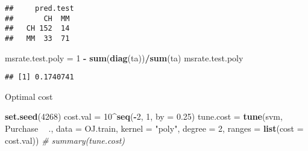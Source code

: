 \documentclass[]{article}
\newenvironment{Shaded}{\begin{snugshade}}{\end{snugshade}}
\newcommand{\CommentTok}[1]{\textcolor[rgb]{0.56,0.35,0.01}{\textit{#1}}}
\newcommand{\DataTypeTok}[1]{\textcolor[rgb]{0.13,0.29,0.53}{#1}}
\newcommand{\DecValTok}[1]{\textcolor[rgb]{0.00,0.00,0.81}{#1}}
\newcommand{\FloatTok}[1]{\textcolor[rgb]{0.00,0.00,0.81}{#1}}
\newcommand{\KeywordTok}[1]{\textcolor[rgb]{0.13,0.29,0.53}{\textbf{#1}}}
\newcommand{\NormalTok}[1]{#1}
\newcommand{\OperatorTok}[1]{\textcolor[rgb]{0.81,0.36,0.00}{\textbf{#1}}}
\newcommand{\StringTok}[1]{\textcolor[rgb]{0.31,0.60,0.02}{#1}}
\begin{document}
\begin{verbatim}
##     pred.test
##       CH  MM
##   CH 152  14
##   MM  33  71
\end{verbatim}

\begin{Shaded}
\begin{Highlighting}[]
\NormalTok{msrate.test.poly =}\StringTok{ }\DecValTok{1} \OperatorTok{-}\StringTok{ }\KeywordTok{sum}\NormalTok{(}\KeywordTok{diag}\NormalTok{(ta))}\OperatorTok{/}\KeywordTok{sum}\NormalTok{(ta)}
\NormalTok{msrate.test.poly}
\end{Highlighting}
\end{Shaded}

\begin{verbatim}
## [1] 0.1740741
\end{verbatim}

Optimal cost

\begin{Shaded}
\begin{Highlighting}[]
\KeywordTok{set.seed}\NormalTok{(}\DecValTok{4268}\NormalTok{)}
\NormalTok{cost.val =}\StringTok{ }\DecValTok{10}\OperatorTok{^}\KeywordTok{seq}\NormalTok{(}\OperatorTok{-}\DecValTok{2}\NormalTok{, }\DecValTok{1}\NormalTok{, }\DataTypeTok{by =} \FloatTok{0.25}\NormalTok{)}
\NormalTok{tune.cost =}\StringTok{ }\KeywordTok{tune}\NormalTok{(svm, Purchase }\OperatorTok{~}\StringTok{ }\NormalTok{., }\DataTypeTok{data =}\NormalTok{ OJ.train, }\DataTypeTok{kernel =} \StringTok{"poly"}\NormalTok{, }\DataTypeTok{degree =} \DecValTok{2}\NormalTok{, }
    \DataTypeTok{ranges =} \KeywordTok{list}\NormalTok{(}\DataTypeTok{cost =}\NormalTok{ cost.val))}
\CommentTok{# summary(tune.cost)}
\end{Highlighting}
\end{Shaded}

\begin{Shaded}
\end{Shaded}
\end{document}

